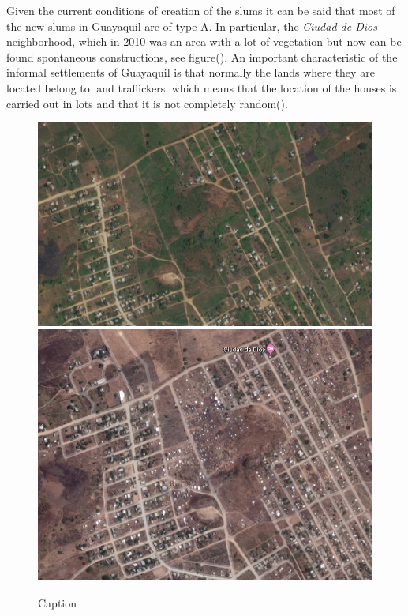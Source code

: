 \documentclass[10pt]{article}
\begin{document}
Given the current conditions of creation of the slums it can be said that most of the new slums in Guayaquil are of type A. In particular, the \emph{Ciudad de Dios} neighborhood, which in 2010 was an area with a lot of vegetation but now can be found spontaneous constructions, see figure(). An important characteristic of the informal settlements of Guayaquil is that normally the lands where they are located belong to land traffickers, which means that the location of the houses is carried out in lots and that it is not completely random().

\begin{figure}[h]
    \centering
    \includegraphics[scale = 0.31]{images/slum2010}
    \includegraphics[scale = 0.22]{images/slum2019}
    \caption{Caption}
    \label{fig:my_label}
\end{figure}
\end{document}
